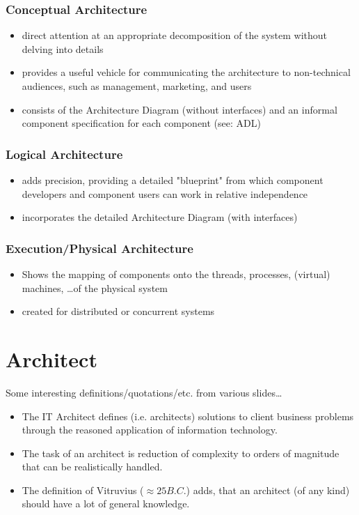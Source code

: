 			\subsubsection*{Conceptual Architecture}
				\begin{itemize}
					\item direct attention at an appropriate decomposition of the system without delving into details
					\item  provides a useful vehicle for communicating the architecture to non-technical audiences, such as management, marketing, and users
					\item consists of the Architecture Diagram (without interfaces) and an informal component
					specification for each component (see: ADL)
				\end{itemize}

			
			\subsubsection*{Logical Architecture}
				\begin{itemize}
					\item  adds precision, providing a detailed "blueprint" from which component developers and component users can work in relative independence
					\item  incorporates the detailed Architecture Diagram (with interfaces)
				\end{itemize}
			
			\subsubsection*{Execution/Physical Architecture}
				\begin{itemize}
					\item Shows the mapping of components onto the threads, processes, (virtual) machines, \ldots of the physical system
					\item created for distributed or concurrent systems\Biglb
				\end{itemize}
			
	\section{Architect}
		Some interesting definitions/quotations/etc. from various slides\ldots
		\begin{itemize}
			\item The IT Architect defines (i.e. architects) solutions to client business problems through the reasoned application of information technology.
			\item The task of an architect is reduction of complexity to orders of	magnitude that can be realistically handled.
			\item The definition of Vitruvius ($ \approx 25 B.C.$) adds, that an architect (of any kind) should have a lot of general knowledge.
		\end{itemize}
